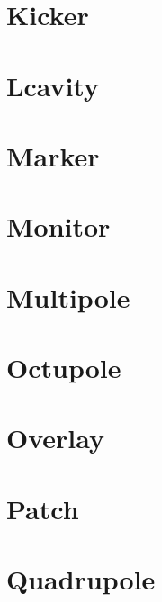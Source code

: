\section{Kicker}
\label{s:k}

\section{Lcavity}
\label{s:lcav}

\section{Marker}
\label{s:mark}

\section{Monitor}
\label{s:mon}

\section{Multipole}
\label{s:m}

\section{Octupole}
\label{s:oct}

\section{Overlay}
\label{s:over}

\section{Patch}
\label{s:patch}

\section{Quadrupole}
\label{s:quad}

